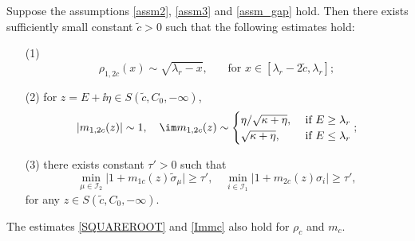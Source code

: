 \begin{lemma}\label{lem_mbehavior}
Suppose the assumptions \eqref{assm2}, \eqref{assm3} and \eqref{assm_gap} hold. Then
there exists sufficiently small constant $\tilde c>0$ such that the following estimates hold:
\begin{itemize}
\item[(1)]
\begin{equation}
\rho_{1,2c}(x) \sim \sqrt{\lambda_r-x}, \quad \ \ \text{ for } x \in \left[\lambda_r - 2\tilde c,\lambda_r \right];\label{SQUAREROOT}
\end{equation}
\item[(2)] for $z =E+\ii \eta\in S(\tilde c,C_0,-\infty)$, 
\begin{equation}\label{Immc}
\vert m_{1,2c}(z) \vert \sim 1,  \quad  \im m_{1,2c}(z) \sim \begin{cases}
    {\eta}/{\sqrt{\kappa+\eta}}, & \text{ if } E\geq \lambda_r \\
    \sqrt{\kappa+\eta}, & \text{ if } E \le \lambda_r\\
  \end{cases};
\end{equation}
\item[(3)] there exists constant $\tau'>0$ such that
\begin{equation}\label{Piii}
\min_{\mu\in \mathcal I_2} \vert 1 + m_{1c}(z)\tilde \sigma_\mu \vert \ge \tau', \quad \min_{i\in \mathcal I_1} \vert 1 + m_{2c}(z)\sigma_i  \vert \ge \tau',
\end{equation}
for any $z \in S(\tilde c,C_0,-\infty)$.
\end{itemize}
The estimates \eqref{SQUAREROOT} and \eqref{Immc} also hold for $\rho_c$ and $m_c$. 
\end{lemma}
